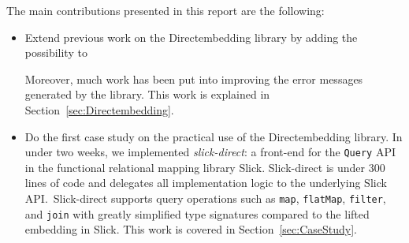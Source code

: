 \documentclass[11pt,a4paper]{article}
\begin{document}
The main contributions presented in this report are the following:
\begin{itemize}
    \item Extend previous work on the Directembedding library by adding the possibility to
        Moreover, much work has been put into improving the error messages generated by the library.
        This work is explained in Section~\ref{sec:Directembedding}.
    \item Do the first case study on the practical use of the Directembedding library.
        In under two weeks, we implemented \emph{slick-direct}: a front-end for the \texttt{Query} API in the functional relational mapping library Slick.
        Slick-direct is under 300 lines of code and delegates all implementation logic to the underlying Slick API.\
        Slick-direct supports query operations such as \texttt{map}, \texttt{flatMap}, \texttt{filter}, and \texttt{join} with greatly simplified type signatures compared to the lifted embedding in Slick.
        This work is covered in Section~\ref{sec:CaseStudy}.
\end{itemize}







\printbibliography{}
\end{document}
